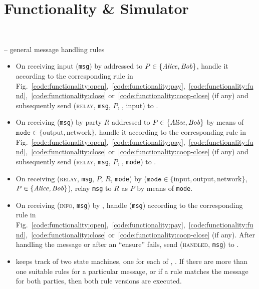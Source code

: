 \section{Functionality \& Simulator} \ \\
\label{sec:functionality}

\begin{center}
  \begin{systembox}{\fchan{} -- general message handling rules}
    \begin{itemize}
      \item On receiving input (\texttt{msg}) by \environment addressed to $P
      \in \{\mathit{Alice}, \mathit{Bob}\}$, handle it according to the corresponding rule in
      Fig.~\ref{code:functionality:open},~\ref{code:functionality:pay},~\ref{code:functionality:fund},~\ref{code:functionality:close}
      or~\ref{code:functionality:coop-close} (if any) and subsequently send
      (\textsc{relay}, \texttt{msg}, $P$, \environment, input) to \adversary.
      \item On receiving (\texttt{msg}) by party $R$ addressed to $P \in \{\mathit{Alice}, \mathit{Bob}\}$
      by means of $\texttt{mode} \in \{\mathrm{output},
      \mathrm{network}\}$, handle it according to the corresponding rule in
      Fig.~\ref{code:functionality:open},~\ref{code:functionality:pay},~\ref{code:functionality:fund},~\ref{code:functionality:close}
      or~\ref{code:functionality:coop-close} (if any) and subsequently send
      (\textsc{relay}, \texttt{msg}, $P$, \environment, \texttt{mode}) to
      \adversary. 
      \item On receiving (\textsc{relay}, \texttt{msg}, $P$, $R$, \texttt{mode})
      by \adversary ($\texttt{mode} \in \{\mathrm{input}, \mathrm{output},
      \mathrm{network}\}$, $P \in \{\mathit{Alice}, \mathit{Bob}\}$), relay \texttt{msg} to $R$
      as $P$ by means of \texttt{mode}. 
      \item On receiving (\textsc{info}, \texttt{msg}) by \adversary, handle
      (\texttt{msg}) according to the corresponding rule in
      Fig.~\ref{code:functionality:open},~\ref{code:functionality:pay},~\ref{code:functionality:fund},~\ref{code:functionality:close}
      or~\ref{code:functionality:coop-close} (if any). After handling the message or
      after an ``ensure'' fails, send (\textsc{handled}, \texttt{msg}) to
      \adversary. 
      \item \fchan keeps track of two state machines, one for each of \alice,
      \bob. If there are more than one suitable rules for a particular message,
      or if a rule matches the message for both parties, then both rule versions
      are executed. 
    \end{itemize}
  \end{systembox}
  \label{code:functionality:rules}
\end{center}
